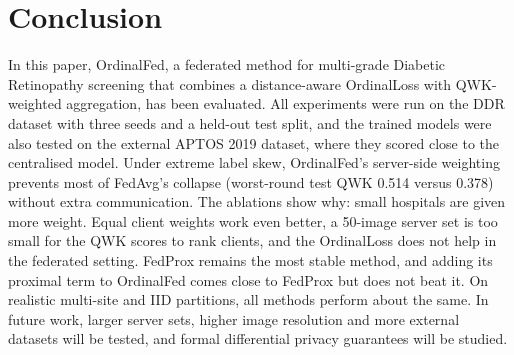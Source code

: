 \section{Conclusion}

In this paper, OrdinalFed, a federated method for multi-grade Diabetic Retinopathy
screening that combines a distance-aware OrdinalLoss with QWK-weighted aggregation,
has been evaluated. All experiments were run on the DDR dataset with three seeds and
a held-out test split, and the trained models were also tested on the external
APTOS 2019 dataset, where they scored close to the centralised model. Under extreme
label skew, OrdinalFed's server-side weighting prevents most of FedAvg's collapse
(worst-round test QWK 0.514 versus 0.378) without extra communication. The
ablations show why: small hospitals are given more weight. Equal client weights
work even better, a 50-image server set is too small for the QWK scores to rank
clients, and the OrdinalLoss does not help in the federated setting. FedProx
remains the most stable method, and adding its proximal term to OrdinalFed comes
close to FedProx but does not beat it. On realistic multi-site and IID partitions,
all methods perform about the same. In future work, larger server sets, higher
image resolution and more external datasets will be tested, and formal differential
privacy guarantees will be studied.
